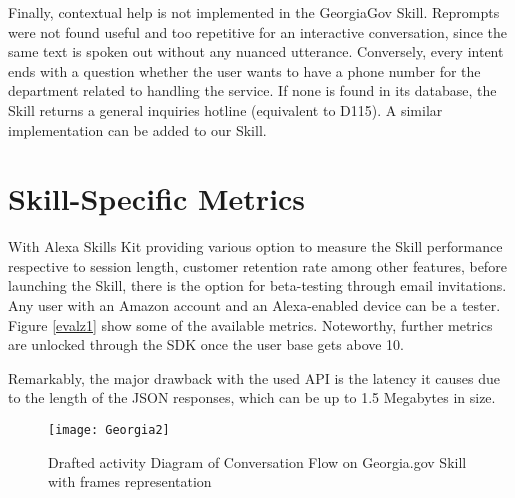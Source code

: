 Finally, contextual help is not implemented in the GeorgiaGov Skill. Reprompts were not found useful and too repetitive for an interactive conversation, since the same text is spoken out without any nuanced utterance.
 Conversely, every intent ends with a question whether the user wants to have a phone number for the department related to handling the service. If none is found in its database, the Skill returns a general inquiries hotline (equivalent to D115). A similar implementation can be added to our Skill.



\section{Skill-Specific Metrics}

With Alexa Skills Kit providing various option to measure the Skill performance  respective to session length, customer retention rate among other features, before launching the Skill, there is the option for beta-testing through email invitations. Any user with an Amazon account and an Alexa-enabled device can be a tester. Figure \ref{evalz1} show some of the available metrics. Noteworthy, further metrics are unlocked through the SDK once the user base gets above 10.

Remarkably, the major drawback with the used API is the latency it causes due to the length of the JSON responses, which can be up to 1.5 Megabytes in size.


\begin{figure}[p]
	
	\caption[Conversation Flow on Georgia.gov]{Drafted activity Diagram of Conversation Flow on Georgia.gov Skill with frames representation}
	\centering %
	\texttt{[image: Georgia2]}
	\label{astah:georgiaActivity}
\end{figure}

